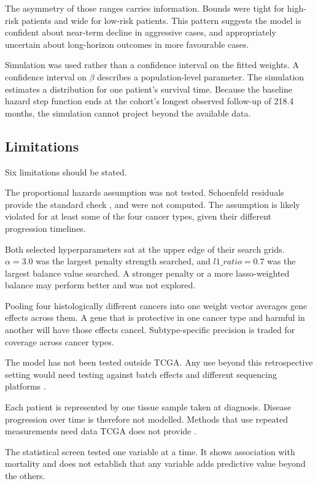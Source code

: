 \documentclass[10pt,a4paper]{article}
\begin{document}
The asymmetry of those ranges carries information. Bounds were tight for
high-risk patients and wide for low-risk patients. This pattern suggests the
model is confident about near-term decline in aggressive cases, and
appropriately uncertain about long-horizon outcomes in more favourable cases.

Simulation was used rather than a confidence interval on the fitted weights. A
confidence interval on $\beta$ describes a population-level parameter. The
simulation estimates a distribution for one patient's survival time. Because the
baseline hazard step function ends at the cohort's longest observed follow-up of
218.4 months, the simulation cannot project beyond the available data.

\subsection{Limitations}

Six limitations should be stated.

The proportional hazards assumption was not tested. Schoenfeld residuals provide
the standard check \citep{schoenfeld1982partial}, and were not computed. The
assumption is likely violated for at least some of the four cancer types, given
their different progression timelines.

Both selected hyperparameters sat at the upper edge of their search grids.
$\alpha = 3.0$ was the largest penalty strength searched, and
$l1\_ratio = 0.7$ was the largest balance value searched. A stronger penalty or
a more lasso-weighted balance may perform better and was not explored.

Pooling four histologically different cancers into one weight vector averages
gene effects across them. A gene that is protective in one cancer type and
harmful in another will have those effects cancel. Subtype-specific precision is
traded for coverage across cancer types.

The model has not been tested outside TCGA. Any use beyond this retrospective
setting would need testing against batch effects and different sequencing
platforms \citep{poirion2021deepprog}.

Each patient is represented by one tissue sample taken at diagnosis. Disease
progression over time is therefore not modelled. Methods that use repeated
measurements need data TCGA does not provide \citep{lee2020dynamic}.

The statistical screen tested one variable at a time. It shows association with
mortality and does not establish that any variable adds predictive value beyond
the others.
\end{document}
